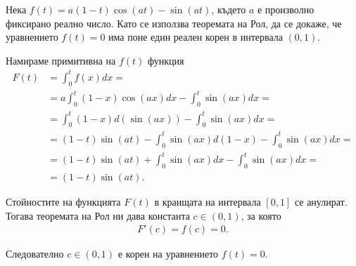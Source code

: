 \documentclass[numbers=endperiod, bibliography=totocnumbered]{scrartcl}
\begin{document}
\begin{exercise}
  Нека \( f(t) = a (1-t) \cos(at) - \sin(at) \), където \( a \) е произволно фиксирано реално число. Като се използва теоремата на Рол, да се докаже, че уравнението \( f(t) = 0 \) има поне един реален корен в интервала \( (0, 1) \).
\end{exercise}
\begin{solution}
  Намираме примитивна на \( f(t) \) функция
  \begingroup
  \allowdisplaybreaks
  \begin{align*}
    F(t)
    &=
    \int_0^t f(x) dx
    = \\ &=
    a \int_0^t (1-x) \cos(ax) dx - \int_0^t \sin(ax) dx
    = \\ &=
    \int_0^t (1-x) d(\sin(ax)) - \int_0^t \sin(ax) dx
    = \\ &=
    (1-t) \sin(at) - \int_0^t \sin(ax) d(1-x) - \int_0^t \sin(ax) dx
    = \\ &=
    (1-t) \sin(at) + \int_0^t \sin(ax) dx - \int_0^t \sin(ax) dx
    = \\ &=
    (1-t) \sin(at).
  \end{align*}
  \endgroup

  Стойностите на функцията \( F(t) \) в краищата на интервала \( [0, 1] \) се анулират. Тогава теоремата на Рол ни дава константа \( c \in (0, 1) \), за която
  \begin{align*}
    F'(c) = f(c) = 0.
  \end{align*}

  Следователно \( c \in (0, 1) \) е корен на уравнението \( f(t) = 0 \).
\end{solution}

\printbibliography
\end{document}
